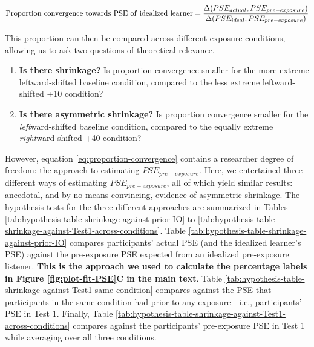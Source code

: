 \documentclass[
  11pt,
  man,mask,floatsintext]{apa6}
\providecommand{\tightlist}{%
  \setlength{\itemsep}{0pt}\setlength{\parskip}{0pt}}
\begin{document}
\begin{equation}
\label{eq:proportion-convergence}
{\rm Proportion\ convergence\ towards\ PSE\ of\ idealized\ learner} = \frac{\Delta(PSE_{actual}, PSE_{pre-exposure})}{\Delta(PSE_{ideal}, PSE_{pre-exposure})}
\end{equation}

This proportion can then be compared across different exposure conditions, allowing us to ask two questions of theoretical relevance.

\begin{enumerate}
\def\labelenumi{\arabic{enumi}.}
\tightlist
\item
  \textbf{Is there shrinkage?} Is proportion convergence smaller for the more extreme leftward-shifted baseline condition, compared to the less extreme leftward-shifted +10 condition?
\item
  \textbf{Is there asymmetric shrinkage?} Is proportion convergence smaller for the \emph{left}ward-shifted baseline condition, compared to the equally extreme \emph{right}ward-shifted +40 condition?
\end{enumerate}

However, equation \eqref{eq:proportion-convergence} contains a researcher degree of freedom: the approach to estimating \(PSE_{pre-exposure}\). Here, we entertained three different ways of estimating \(PSE_{pre-exposure}\), all of which yield similar results: anecdotal, and by no means convincing, evidence of asymmetric shrinkage. The hypothesis tests for the three different approaches are summarized in Tables \ref{tab:hypothesis-table-shrinkage-against-prior-IO} to \ref{tab:hypothesis-table-shrinkage-against-Test1-across-conditions}. Table \ref{tab:hypothesis-table-shrinkage-against-prior-IO} compares participants' actual PSE (and the idealized learner's PSE) against the pre-exposure PSE expected from an idealized pre-exposure listener. \textbf{This is the approach we used to calculate the percentage labels in Figure \ref{fig:plot-fit-PSE}C in the main text}. Table \ref{tab:hypothesis-table-shrinkage-against-Test1-same-condition} compares against the PSE that participants in the same condition had prior to any exposure---i.e., participants' PSE in Test 1. Finally, Table \ref{tab:hypothesis-table-shrinkage-against-Test1-across-conditions} compares against the participants' pre-exposure PSE in Test 1 while averaging over all three conditions.
\end{document}
